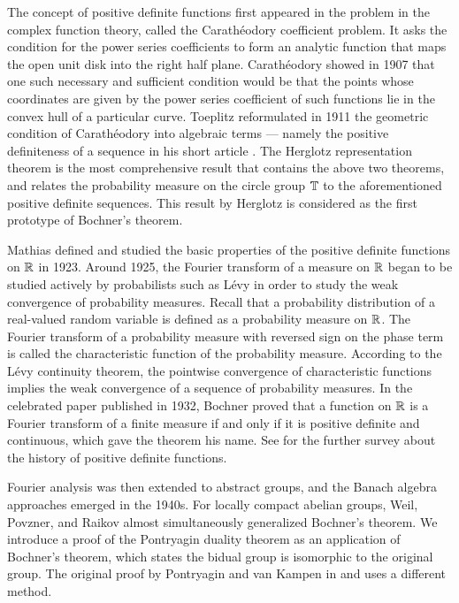 \documentclass[a4paper]{article}
\begin{document}
The concept of positive definite functions first appeared in the problem in the complex function theory, called the Carath\'eodory coefficient problem.
It asks the condition for the power series coefficients to form an analytic function that maps the open unit disk into the right half plane.
Carath\'eodory \cite{caratheodory1907variabilitatsbereich} showed in 1907 that one such necessary and sufficient condition would be that the points whose coordinates are given by the power series coefficient of such functions lie in the convex hull of a particular curve.
Toeplitz reformulated in 1911 the geometric condition of Carath\'eodory into algebraic terms --- namely the positive definiteness of a sequence in his short article \cite{toeplitz1911fourier}.
The Herglotz representation theorem is the most comprehensive result that contains the above two theorems, and relates the probability measure on the circle group $\mathbb{T}$ to the aforementioned positive definite sequences.
This result by Herglotz \cite{herglotz1911uber} is considered as the first prototype of Bochner's theorem.

Mathias \cite{mathias1923positive} defined and studied the basic properties of the positive definite functions on $\mathbb{R}$ in 1923.
Around 1925, the Fourier transform of a measure on $\mathbb{R}$ began to be studied actively by probabilists such as L\'evy in order to study the weak convergence of probability measures.
Recall that a probability distribution of a real-valued random variable is defined as a probability measure on $\mathbb{R}$.
The Fourier transform of a probability measure with reversed sign on the phase term is called the characteristic function of the probability measure.
According to the L\'evy continuity theorem, the pointwise convergence of characteristic functions implies the weak convergence of a sequence of probability measures.
In the celebrated paper \cite{bochner1932vorlesungen} published in 1932, Bochner proved that a function on $\mathbb{R}$ is a Fourier transform of a finite measure if and only if it is positive definite and continuous, which gave the theorem his name.
See \cite{stewart1976positive} for the further survey about the history of positive definite functions.

Fourier analysis was then extended to abstract groups, and the Banach algebra approaches emerged in the 1940s.
For locally compact abelian groups, Weil, Povzner, and Raikov almost simultaneously generalized Bochner's theorem.
We introduce a proof of the Pontryagin duality theorem as an application of Bochner's theorem, which states the bidual group is isomorphic to the original group.
The original proof by Pontryagin and van Kampen in \cite{pontrjagin1934theory} and \cite{van1935locally} uses a different method.
\end{document}
